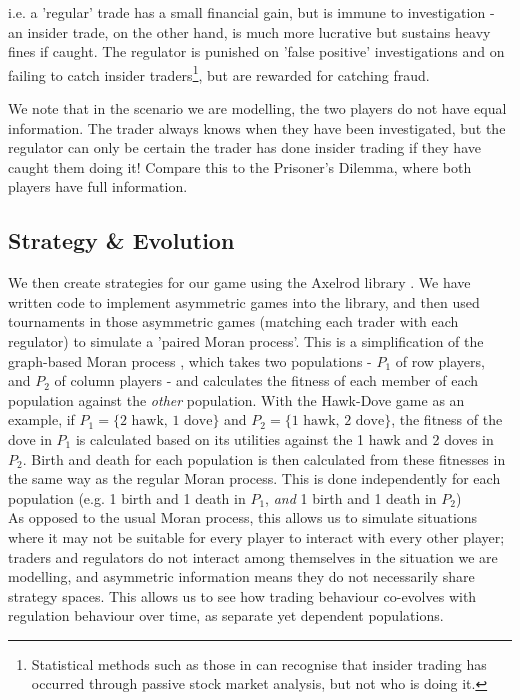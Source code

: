 \documentclass{article}
\begin{document}
i.e. a 'regular' trade has a small financial gain, but is immune to investigation - an insider trade, on the other hand, is much more lucrative but sustains heavy fines if caught. The regulator is punished on 'false positive' investigations and on failing to catch insider traders\footnote[2]{Statistical methods such as those in \citet{bris2005insider} can recognise that insider trading has occurred through passive stock market analysis, but not who is doing it.}, but are rewarded for catching fraud. 

We note that in the scenario we are modelling, the two players do not have equal information. The trader always knows when they have been investigated, but the regulator can only be certain the trader has done insider trading if they have caught them doing it! Compare this to the Prisoner's Dilemma, where both players have full information.

\subsection{Strategy \& Evolution}
We then create strategies for our game using the Axelrod library \citep{axelrodproject}. We have written code to implement asymmetric games into the library, and then used tournaments in those asymmetric games (matching each trader with each regulator) to simulate a 'paired Moran process'. This is a simplification of the graph-based Moran process \citep{shakarian2013novel}, which takes two populations - $P_1$ of row players, and $P_2$ of column players - and calculates the fitness of each member of each population against the \emph{other} population. With the Hawk-Dove game as an example, if $P_1 = \{\text{2 hawk, 1 dove}\}$ and $P_2 = \{\text{1 hawk, 2 dove}\}$, the fitness of the dove in $P_1$ is calculated based on its utilities against the 1 hawk and 2 doves in $P_2$. Birth and death for each population is then calculated from these fitnesses in the same way as the regular Moran process. This is done independently for each population (e.g. 1 birth and 1 death in $P_1$, \emph{and} 1 birth and 1 death in $P_2$)
\\

As opposed to the usual Moran process, this allows us to simulate situations where it may not be suitable for every player to interact with every other player; traders and regulators do not interact among themselves in the situation we are modelling, and asymmetric information means they do not necessarily share strategy spaces. This allows us to see how trading behaviour co-evolves with regulation behaviour over time, as separate yet dependent populations.
\end{document}
